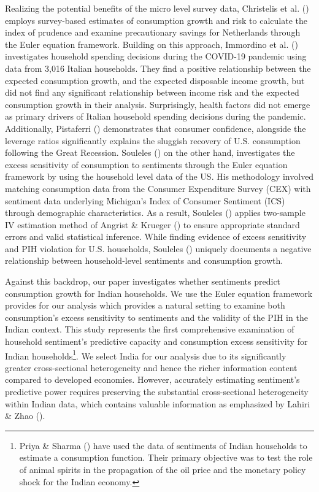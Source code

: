 \documentclass[
  abstract]{scrartcl}
\begin{document}
Realizing the potential benefits of the micro level survey data,
Christelis et al. () employs
survey-based estimates of consumption growth and risk to calculate the
index of prudence and examine precautionary savings for Netherlands
through the Euler equation framework. Building on this approach,
Immordino et al. ()
investigates household spending decisions during the COVID-19 pandemic
using data from 3,016 Italian households. They find a positive
relationship between the expected consumption growth, and the expected
disposable income growth, but did not find any significant relationship
between income risk and the expected consumption growth in their
analysis. Surprisingly, health factors did not emerge as primary drivers
of Italian household spending decisions during the pandemic.
Additionally, Pistaferri ()
demonstrates that consumer confidence, alongside the leverage ratios
significantly explains the sluggish recovery of U.S. consumption
following the Great Recession. Souleles
() on the other hand,
investigates the excess sensitivity of consumption to sentiments through
the Euler equation framework by using the household level data of the
US. His methodology involved matching consumption data from the Consumer
Expenditure Survey (CEX) with sentiment data underlying Michigan's Index
of Consumer Sentiment (ICS) through demographic characteristics. As a
result, Souleles ()
applies two-sample IV estimation method of Angrist \& Krueger
() to ensure appropriate
standard errors and valid statistical inference. While finding evidence
of excess sensitivity and PIH violation for U.S. households, Souleles
() uniquely documents a
negative relationship between household-level sentiments and consumption
growth.

Against this backdrop, our paper investigates whether sentiments predict
consumption growth for Indian households. We use the Euler equation
framework provides for our analysis which provides a natural setting to
examine both consumption's excess sensitivity to sentiments and the
validity of the PIH in the Indian context. This study represents the
first comprehensive examination of household sentiment's predictive
capacity and consumption excess sensitivity for Indian
households\footnote{Priya \& Sharma
  () have used the data of
  sentiments of Indian households to estimate a consumption function.
  Their primary objective was to test the role of animal spirits in the
  propagation of the oil price and the monetary policy shock for the
  Indian economy.}. We select India for our analysis due to its
significantly greater cross-sectional heterogeneity and hence the richer
information content compared to developed economies. However, accurately
estimating sentiment's predictive power requires preserving the
substantial cross-sectional heterogeneity within Indian data, which
contains valuable information as emphasized by Lahiri \& Zhao
().
\end{document}
